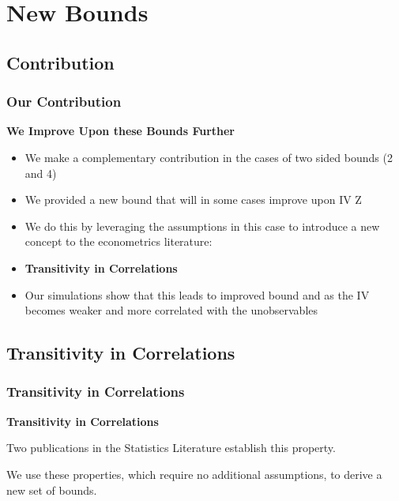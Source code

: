 \documentclass{beamer}
\begin{document}
\section{New Bounds}

\subsection{Contribution}

\begin{frame}
\frametitle{Our Contribution}
\textbf{We Improve Upon these Bounds Further} \\ \medskip \pause

\begin{itemize}
  \item We make a complementary contribution in the cases of two sided bounds (2 and 4) \pause
  \item We provided a new bound that will in some cases improve upon IV Z \pause
  \item We do this by leveraging the assumptions in this case to introduce a new concept to the econometrics literature: \pause \pause
  \item \textbf{Transitivity in Correlations} \pause
  \item Our simulations show that this leads to improved bound and as the IV becomes weaker and more correlated with the unobservables
\end{itemize}

\end{frame}

\subsection{Transitivity in Correlations}

\begin{frame}
\frametitle{Transitivity in Correlations}
\textbf{Transitivity in Correlations} \\ \bigskip \pause 

Two publications in the Statistics Literature establish this property. \\ \medskip \pause

We use these properties, which require no additional assumptions, to derive a new set of bounds. \\ \medskip 

\end{frame}
\end{document}
